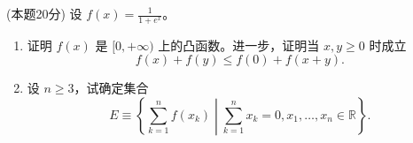 \documentclass[loose]{ExBook}
\begin{document}
\begin{qitems}
    \begin{bbox}
        \qitem (本题20分) 设 \( f(x) = \frac{1}{1 + e^x} \)。
        
        \begin{enumerate}[label=(\roman*)]
            \item 证明 \( f(x) \) 是 \([0,+\infty)\) 上的凸函数。进一步，证明当 \( x, y \geq 0 \) 时成立
            \[
            f(x) + f(y) \leq f(0) + f(x + y).
            \]
            \item 设 \( n \geq 3 \)，试确定集合
            \[
            E \equiv \left\{ \sum_{k=1}^n f(x_k) \middle| \sum_{k=1}^n x_k = 0, x_1, \ldots, x_n \in \mathbb{R} \right\}.
            \]
        \end{enumerate}
    \end{bbox}
\end{qitems}
\end{document}
